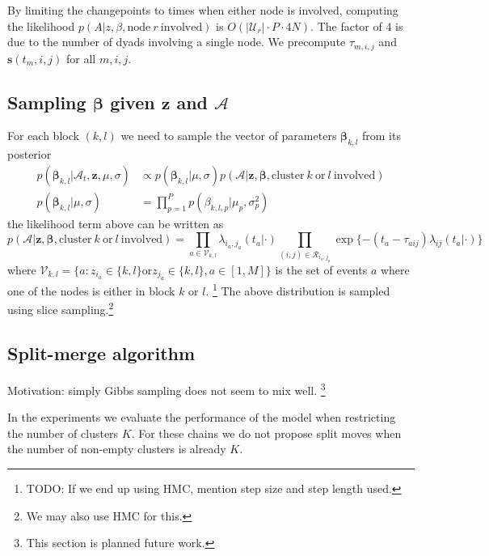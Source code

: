 \documentclass[11pt]{article}
\begin{document}
 By limiting the changepoints to times when either node is involved, computing the likelihood $p(A|z,\beta,\mbox{node} \ r \ \mbox{involved})$ is $O(|\mathcal{U}_r| \cdot P \cdot 4N)$.  The factor of 4 is due to the number of dyads involving a single node.  We precompute $\tau_{m,i,j}$ and $\mathbf{s}(t_m,i,j)$ for all $m,i,j$. 


\subsection*{Sampling $\boldsymbol{\beta}$ given $\mathbf{z}$ and $\mathcal{A}$ }

For each block $(k,l)$ we need to sample the vector of parameters $\boldsymbol{\beta}_{k,l}$ from its posterior
\begin{align*}
p(\boldsymbol{\beta}_{k,l} | \mathcal{A}_t, \textbf{z}, \mu, \sigma) &\propto p(\boldsymbol{\beta}_{k,l} | \mu, \sigma) p( \mathcal{A}| \textbf{z}, \boldsymbol{\beta}, \mbox{cluster} \ k \ \mbox{or} \ l \ \mbox{involved}) \\  
p(\boldsymbol{\beta}_{k,l} | \mu, \sigma) &= \prod_{p=1}^Pp(\beta_{k,l,p}|\mu_p,\sigma_p^2)
\end{align*}
the likelihood term above can be written as
$$p(\mathcal{A}|\mathbf{z},\boldsymbol{\beta},\mbox{cluster} \ k \ \mbox{or} \ l \ \mbox{involved}) = \prod_{a \in \mathcal{V}_{k,l}} \lambda_{i_a,j_a}(t_a|\cdot)
\prod_{(i,j) \in \mathcal{R}_{i_a,j_a}} \exp \{ -(t_a - \tau_{aij}) \lambda_{ij}(t_a|\cdot)\}$$
\noindent where $\mathcal{V}_{k,l} = \{a: z_{i_a} \in \{k,l\} \mbox{or} z_{j_a} \in \{k,l\}, a \in [1,M]\}$ is the set of events $a$ where one of the nodes is either in block $k$ or $l$.  \footnote{TODO: If we end up using HMC, mention step size and step length used.}
The above distribution is sampled using slice sampling.\footnote{We may also use HMC for this.}

\subsection*{Split-merge algorithm}

Motivation: simply Gibbs sampling does not seem to mix well.  \footnote{This section is planned future work.}

In the experiments we evaluate the performance of the model when restricting the number of clusters $K$.  For these chains we do not propose split moves when the number of non-empty clusters is already $K$.

\end{document}
